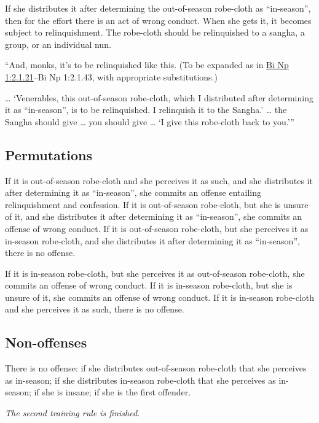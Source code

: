 \documentclass[12pt,openany]{book}%
\newcommand*{\scendsutta}[1]{\begin{Center}\textit{#1}\end{Center}\addvspace{1em}}
\begin{document}
If she distributes it after determining the out-of-season robe-cloth as “in-season”, then for the effort there is an act of wrong conduct. When she gets it, it becomes subject to relinquishment. The robe-cloth should be relinquished to a sangha, a group, or an individual nun. 

“And, monks, it’s to be relinquished like this. (To be expanded as in \href{https://suttacentral.net/pli-tv-bi-vb-np1/en/brahmali\#2.1.21}{Bi Np 1:2.1.21}–Bi Np 1:2.1.43, with appropriate substitutions.) 

… ‘Venerables, this out-of-season robe-cloth, which I distributed after determining it as “in-season”, is to be relinquished. I relinquish it to the Sangha.’ … the Sangha should give … you should give … ‘I give this robe-cloth back to you.’” 

\subsection*{Permutations }

If it is out-of-season robe-cloth and she perceives it as such, and she distributes it after determining it as “in-season”, she commits an offense entailing relinquishment and confession. If it is out-of-season robe-cloth, but she is unsure of it, and she distributes it after determining it as “in-season”, she commits an offense of wrong conduct. If it is out-of-season robe-cloth, but she perceives it as in-season robe-cloth, and she distributes it after determining it as “in-season”, there is no offense. 

If it is in-season robe-cloth, but she perceives it as out-of-season robe-cloth, she commits an offense of wrong conduct. If it is in-season robe-cloth, but she is unsure of it, she commits an offense of wrong conduct. If it is in-season robe-cloth and she perceives it as such, there is no offense. 

\subsection*{Non-offenses }

There is no offense: if she distributes out-of-season robe-cloth that she perceives as in-season;  if she distributes in-season robe-cloth that she perceives as in-season;  if she is insane;  if she is the first offender. 

\scendsutta{The second training rule is finished. }
\end{document}

